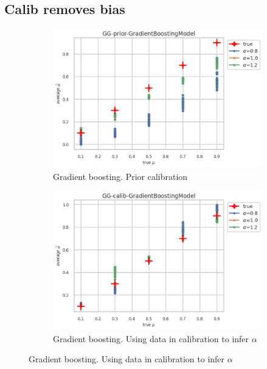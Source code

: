 \subsection{Calib removes bias}


\begin{figure}[ht!]
  \centering
  \begin{subfigure}[t]{0.49\linewidth}
    \includegraphics[width=\linewidth]{COMPARE/GG-prior/GradientBoostingModel/profusion_true_mu_target_mean.png}
    \caption{Gradient boosting. Prior calibration}
  \end{subfigure}%
  \hfill
  \begin{subfigure}[t]{0.49\linewidth}
    \includegraphics[width=\linewidth]{COMPARE/GG-calib/GradientBoostingModel/profusion_true_mu_target_mean.png}
    \caption{Gradient boosting. Using data in calibration to infer $\alpha$}
  \end{subfigure}


\end{figure}
